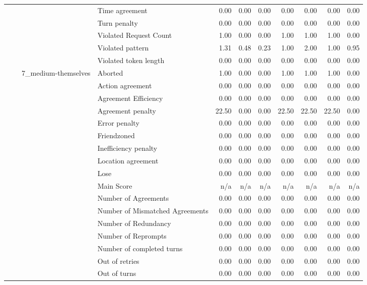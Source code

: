 \begin{tabular}{llllrrrrrrr}
 &  &  & Time agreement & 0.00 & 0.00 & 0.00 & 0.00 & 0.00 & 0.00 & 0.00 \\
 &  &  & Turn penalty & 0.00 & 0.00 & 0.00 & 0.00 & 0.00 & 0.00 & 0.00 \\
 &  &  & Violated Request Count & 1.00 & 0.00 & 0.00 & 1.00 & 1.00 & 1.00 & 0.00 \\
 &  &  & Violated pattern & 1.31 & 0.48 & 0.23 & 1.00 & 2.00 & 1.00 & 0.95 \\
 &  &  & Violated token length & 0.00 & 0.00 & 0.00 & 0.00 & 0.00 & 0.00 & 0.00 \\
\cline{3-11}
 &  & \multirow[t]{27}{*}{7_medium-themselves} & Aborted & 1.00 & 0.00 & 0.00 & 1.00 & 1.00 & 1.00 & 0.00 \\
 &  &  & Action agreement & 0.00 & 0.00 & 0.00 & 0.00 & 0.00 & 0.00 & 0.00 \\
 &  &  & Agreement Efficiency & 0.00 & 0.00 & 0.00 & 0.00 & 0.00 & 0.00 & 0.00 \\
 &  &  & Agreement penalty & 22.50 & 0.00 & 0.00 & 22.50 & 22.50 & 22.50 & 0.00 \\
 &  &  & Error penalty & 0.00 & 0.00 & 0.00 & 0.00 & 0.00 & 0.00 & 0.00 \\
 &  &  & Friendzoned & 0.00 & 0.00 & 0.00 & 0.00 & 0.00 & 0.00 & 0.00 \\
 &  &  & Inefficiency penalty & 0.00 & 0.00 & 0.00 & 0.00 & 0.00 & 0.00 & 0.00 \\
 &  &  & Location agreement & 0.00 & 0.00 & 0.00 & 0.00 & 0.00 & 0.00 & 0.00 \\
 &  &  & Lose & 0.00 & 0.00 & 0.00 & 0.00 & 0.00 & 0.00 & 0.00 \\
 &  &  & Main Score & n/a & n/a & n/a & n/a & n/a & n/a & n/a \\
 &  &  & Number of Agreements & 0.00 & 0.00 & 0.00 & 0.00 & 0.00 & 0.00 & 0.00 \\
 &  &  & Number of Mismatched Agreements & 0.00 & 0.00 & 0.00 & 0.00 & 0.00 & 0.00 & 0.00 \\
 &  &  & Number of Redundancy & 0.00 & 0.00 & 0.00 & 0.00 & 0.00 & 0.00 & 0.00 \\
 &  &  & Number of Reprompts & 0.00 & 0.00 & 0.00 & 0.00 & 0.00 & 0.00 & 0.00 \\
 &  &  & Number of completed turns & 0.00 & 0.00 & 0.00 & 0.00 & 0.00 & 0.00 & 0.00 \\
 &  &  & Out of retries & 0.00 & 0.00 & 0.00 & 0.00 & 0.00 & 0.00 & 0.00 \\
 &  &  & Out of turns & 0.00 & 0.00 & 0.00 & 0.00 & 0.00 & 0.00 & 0.00 \\

\end{tabular}
